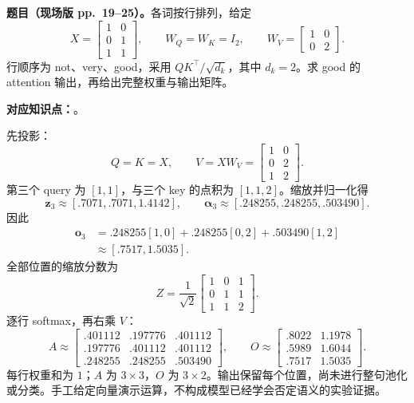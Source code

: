 \nopagebreak[4]
\textbf{题目（现场版 pp.~19--25）。}各词按行排列，给定
\[
 X=\begin{bmatrix}1&0\\0&1\\1&1\end{bmatrix},\qquad
 W_Q=W_K=I_2,\qquad
 W_V=\begin{bmatrix}1&0\\0&2\end{bmatrix}.
\]
行顺序为 not、very、good，采用 $QK^\top/\sqrt{d_k}$，其中 $d_k=2$。求 good 的 attention 输出，再给出完整权重与输出矩阵。

\textbf{对应知识点：}。

\begin{workedsolution}
先投影：
\[
 Q=K=X,\qquad V=XW_V=\begin{bmatrix}1&0\\0&2\\1&2\end{bmatrix}.
\]
第三个 query 为 $[1,1]$，与三个 key 的点积为 $[1,1,2]$。缩放并归一化得
\[
 \mathbf z_3\approx[.7071,.7071,1.4142],\qquad
 \boldsymbol\alpha_3\approx[.248255,.248255,.503490].
\]
因此
\begin{align*}
 \mathbf o_3
 &=.248255[1,0]+.248255[0,2]+.503490[1,2]\\
 &\approx\boxed{[.7517,1.5035]}.
\end{align*}
全部位置的缩放分数为
\[
 Z=\frac1{\sqrt2}\begin{bmatrix}1&0&1\\0&1&1\\1&1&2\end{bmatrix}.
\]
逐行 softmax，再右乘 $V$：
\[
 A\approx\begin{bmatrix}
 .401112&.197776&.401112\\
 .197776&.401112&.401112\\
 .248255&.248255&.503490
 \end{bmatrix},\qquad
 O\approx\begin{bmatrix}
 .8022&1.1978\\.5989&1.6044\\.7517&1.5035
 \end{bmatrix}.
\]
每行权重和为 $1$；$A$ 为 $3\times3$，$O$ 为 $3\times2$。输出保留每个位置，尚未进行整句池化或分类。手工给定向量演示运算，不构成模型已经学会否定语义的实验证据。
\end{workedsolution}

